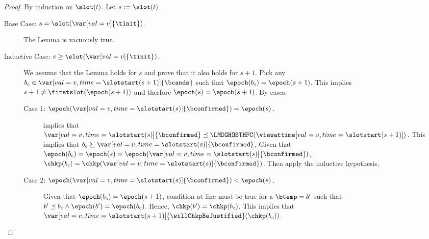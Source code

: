\documentclass{article}
\begin{document}
\begin{proof}
    By induction on $\slot(t)$.
    Let $s := \slot(t)$.
    \begin{description}
        \item[Base Case: {$s = \slot(\var[val=v]{\tinit})$}.] The Lemma is vacuously true.
        \item[Inductive Case: {$s \geq \slot(\var[val=v]{\tinit})$}.]
            We assume that the Lemma holds for $s$ and prove that it also holds for $s+1$.
            Pick any $b_c \in \var[val=v,time=\slotstart(s+1)]{\bcands}$ such that $\epoch(b_c) = \epoch(s+1)$.
            This implies $s+1 \neq \firstslot(\epoch(s+1))$ and therfore $\epoch(s) = \epoch(s+1)$.
            By cases.
            \begin{description}
                \item[Case 1: {$\epoch(\var[val=v,time=\slotstart(s)]{\bconfirmed}) = \epoch(s)$}.] 
                 implies that $\var[val=v,time=\slotstart(s)]{\bconfirmed} \preceq \LMDGHOSTHFC(\viewattime[val=v,time=\slotstart(s+1)])$.
                This implies that $b_c \succeq \var[val=v,time=\slotstart(s)]{\bconfirmed}$.
                Given that $\epoch(b_c) = \epoch(s) = \epoch(\var[val=v,time=\slotstart(s)]{\bconfirmed})$, $\chkp(b_c) = \chkp(\var[val=v,time=\slotstart(s)]{\bconfirmed})$.
                Then apply the inductive hypothesis.
                \item[Case 2: {$\epoch(\var[val=v,time=\slotstart(s)]{\bconfirmed}) < \epoch(s)$}.] 
                Given that $\epoch(b_c) = \epoch(s+1)$, condition at line  must be true for a $\btemp = b'$ such that $b' \preceq b_c \land \epoch(b') = \epoch(b_c)$.
                Hence, $\chkp(b') = \chkp(b_c)$.
                This implies that $\var[val=v,time=\slotstart(s+1)]{\willChkpBeJustified}(\chkp(b_c))$.
            \end{description}
    \end{description}
\end{proof}
\end{document}
